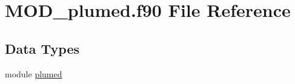 \hypertarget{MOD__plumed_8f90}{\section{M\-O\-D\-\_\-plumed.\-f90 File Reference}
\label{MOD__plumed_8f90}
}
\subsection*{Data Types}
\begin{DoxyCompactItemize}
\item 
module \hyperlink{classplumed}{plumed}
\end{DoxyCompactItemize}
